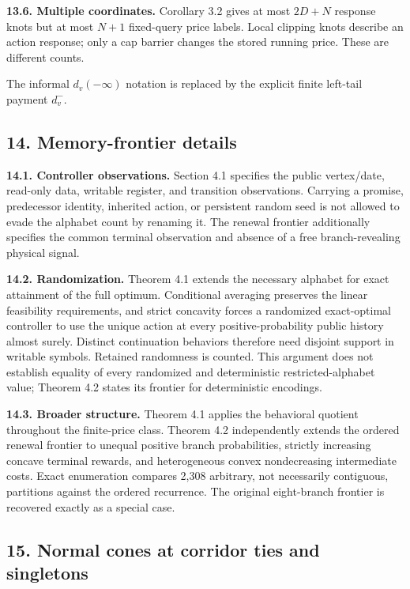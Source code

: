 \documentclass[
  11pt,
]{article}
\begin{document}
\textbf{13.6. Multiple coordinates.} Corollary 3.2 gives at most
\(2D+N\) response knots but at most \(N+1\) fixed-query price labels.
Local clipping knots describe an action response; only a cap barrier
changes the stored running price. These are different counts.

The informal \(d_v(-\infty)\) notation is replaced by the explicit
finite left-tail payment \(d_v^-\).

\subsection{14. Memory-frontier details}\label{memory-frontier-details}

\textbf{14.1. Controller observations.} Section 4.1 specifies the public
vertex/date, read-only data, writable register, and transition
observations. Carrying a promise, predecessor identity, inherited
action, or persistent random seed is not allowed to evade the alphabet
count by renaming it. The renewal frontier additionally specifies the
common terminal observation and absence of a free branch-revealing
physical signal.

\textbf{14.2. Randomization.} Theorem 4.1 extends the necessary alphabet
for exact attainment of the full optimum. Conditional averaging
preserves the linear feasibility requirements, and strict concavity
forces a randomized exact-optimal controller to use the unique action at
every positive-probability public history almost surely. Distinct
continuation behaviors therefore need disjoint support in writable
symbols. Retained randomness is counted. This argument does not
establish equality of every randomized and deterministic
restricted-alphabet value; Theorem 4.2 states its frontier for
deterministic encodings.

\textbf{14.3. Broader structure.} Theorem 4.1 applies the behavioral
quotient throughout the finite-price class. Theorem 4.2 independently
extends the ordered renewal frontier to unequal positive branch
probabilities, strictly increasing concave terminal rewards, and
heterogeneous convex nondecreasing intermediate costs. Exact enumeration
compares 2,308 arbitrary, not necessarily contiguous, partitions against
the ordered recurrence. The original eight-branch frontier is recovered
exactly as a special case.

\subsection{15. Normal cones at corridor ties and
singletons}\label{normal-cones-at-corridor-ties-and-singletons}
\end{document}
